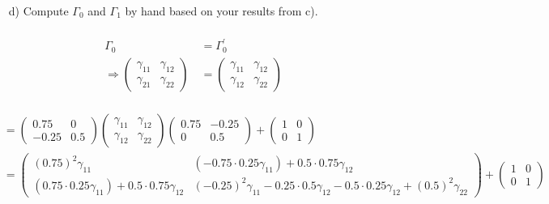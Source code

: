 \documentclass[12pt,a4paper]{article}
\begin{document}
\begin{itemize}
    \item[d)] Compute $\Gamma_0$ and $\Gamma_1$ by hand based on your results from c).
\end{itemize}

\begin{align*}
\\
  \Gamma_0 & = \Gamma_0^{'}\\
  \Rightarrow
  \begin{pmatrix} 
  \gamma_{11} & \gamma_{12}\\
  \gamma_{21} & \gamma_{22}
  \end{pmatrix} \ & =
  \begin{pmatrix} 
  \gamma_{11} & \gamma_{12}\\
  \gamma_{12} & \gamma_{22}
  \end{pmatrix}\\ 
\end{align*}

\begin{align*}
  & =
  \begin{pmatrix} 
  0.75 & 0\\
  -0.25 & 0.5
  \end{pmatrix} 
  \begin{pmatrix} 
  \gamma_{11} & \gamma_{12}\\
  \gamma_{12} & \gamma_{22}
  \end{pmatrix}
  \begin{pmatrix} 
  0.75 & -0.25\\
  0 & 0.5
  \end{pmatrix} +
  \begin{pmatrix} 
  1 & 0\\
  0 & 1
  \end{pmatrix}\\
  & = 
  \begin{pmatrix}
  (0.75)^2 \gamma_{11} & (-0.75 \cdot 0.25 \gamma_{11}) + 0.5 \cdot 0.75 \gamma_{12} \\
  (0.75 \cdot 0.25 \gamma_{11}) + 0.5 \cdot 0.75 \gamma_{12} & (-0.25)^2 \gamma_{11} - 0.25 \cdot 0.5 \gamma_{12} - 0.5 \cdot 0.25 \gamma_{12} + (0.5)^2 \gamma_{22}
  \end{pmatrix} +
  \begin{pmatrix}
  1 & 0\\
  0 & 1
  \end{pmatrix}
  \end{align*}
\end{document}
